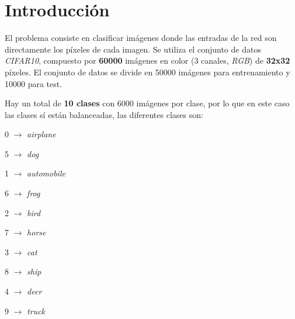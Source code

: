 \documentclass{uc3mpracticas}
\begin{document}
  \frontmatter



  \vspace{55mm}


  \newpage

  \tableofcontents

  \newpage

  \mainmatter

\section{Introducción}

El problema consiste en clasificar imágenes donde las entradas de la red son directamente los píxeles de cada imagen. Se utiliza el conjunto de datos \textit{CIFAR10}, compuesto por \textbf{60000} imágenes en color (3 canales, \textit{RGB}) de \textbf{32x32} píxeles. El conjunto de datos se divide en 50000 imágenes para entrenamiento y 10000 para test.

\vspace{2mm}

Hay un total de \textbf{10 clases} con 6000 imágenes por clase, por lo que en este caso las clases sí están balanceadas, las diferentes clases son:

\begin{itemize}
  \begin{multicols}{5}
  \item 0 $\rightarrow$ \textit{airplane}
  \item 5 $\rightarrow$ \textit{dog}
  \item 1 $\rightarrow$ \textit{automobile}
  \item 6 $\rightarrow$ \textit{frog}
  \item 2 $\rightarrow$ \textit{bird}
  \item 7 $\rightarrow$ \textit{horse}
  \item 3 $\rightarrow$ \textit{cat}
  \item 8 $\rightarrow$ \textit{ship}
  \item 4 $\rightarrow$ \textit{deer}
  \item 9 $\rightarrow$ \textit{truck}
  \end{multicols}
\end{itemize}
\end{document}
